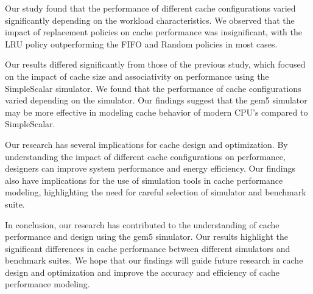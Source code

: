 \documentclass[conference]{IEEEtran}
\begin{document}
Our study found that the performance of different cache configurations varied significantly depending on the workload characteristics. We observed that the impact of replacement policies on cache performance was insignificant, with the LRU policy outperforming the FIFO and Random policies in most cases.

Our results differed significantly from those of the previous study, which focused on the impact of cache size and associativity on performance using the SimpleScalar simulator. We found that the performance of cache configurations varied depending on the simulator. Our findings suggest that the gem5 simulator may be more effective in modeling cache behavior of modern CPU's compared to SimpleScalar.

Our research has several implications for cache design and optimization. By understanding the impact of different cache configurations on performance, designers can improve system performance and energy efficiency. Our findings also have implications for the use of simulation tools in cache performance modeling, highlighting the need for careful selection of simulator and benchmark suite.

In conclusion, our research has contributed to the understanding of cache performance and design using the gem5 simulator. Our results highlight the significant differences in cache performance between different simulators and benchmark suites. We hope that our findings will guide future research in cache design and optimization and improve the accuracy and efficiency of cache performance modeling.

\printbibliography
\onecolumn

\appendix
\setcounter{section}{0}
\end{document}
